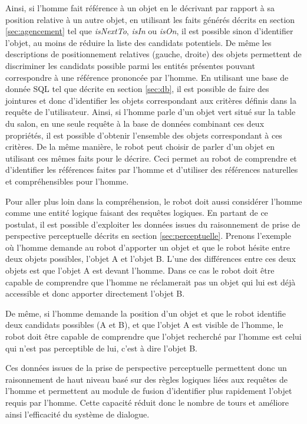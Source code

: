 \documentclass[a4paper,11pt,twoside]{StyleThese}
\begin{document}
Ainsi, si l'homme fait référence à un objet en le décrivant par rapport à sa position relative à un autre objet, en utilisant les faits générés décrits en section \ref{sec:agencement} tel que \textit{isNextTo}, \textit{isIn} ou \textit{isOn}, il est possible sinon d'identifier l'objet, au moins de réduire la liste des candidats potentiels. De même les descriptions de positionnement relatives (gauche, droite) des objets permettent de discriminer les candidats possible parmi les entités présentes pouvant correspondre à une référence prononcée par l'homme.
En utilisant une base de donnée SQL tel que décrite en section \ref{sec:db}, il est possible de faire des jointures et donc d'identifier les objets correspondant aux critères définis dans la requête de l'utilisateur.
Ainsi, si l'homme parle d'un objet vert situé sur la table du salon, en une seule requête à la base de données combinant ces deux propriétés, il est possible d'obtenir l'ensemble des objets correspondant à ces critères.
De la même manière, le robot peut choisir de parler d'un objet en utilisant ces mêmes faits pour le décrire.
Ceci permet au robot de comprendre et d'identifier les références faites par l'homme et d'utiliser des références naturelles et compréhensibles pour l'homme.

Pour aller plus loin dans la compréhension, le robot doit aussi considérer l'homme comme une entité logique faisant des requêtes logiques. En partant de ce postulat, il est possible d'exploiter les données issues du raisonnement de prise de perspective perceptuelle décrits en section \ref{sec:perceptuelle}.
Prenons l'exemple où l'homme demande au robot d'apporter un objet et que le robot hésite entre deux objets possibles, l'objet A et l'objet B. L'une des différences entre ces deux objets est que l'objet A est devant l'homme. Dans ce cas le robot doit être capable de comprendre que l'homme ne réclamerait pas un objet qui lui est déjà accessible et donc apporter directement l'objet B.

De même, si l'homme demande la position d'un objet et que le robot identifie deux candidats possibles (A et B), et que l'objet A est visible de l'homme, le robot doit être capable de comprendre que l'objet recherché par l'homme est celui qui n'est pas perceptible de lui, c'est à dire l'objet B.

Ces données issues de la prise de perspective perceptuelle permettent donc un raisonnement de haut niveau basé sur des règles logiques liées aux requêtes de l'homme et permettent au module de fusion d'identifier plus rapidement l'objet requis par l'homme. Cette capacité réduit donc le nombre de tours et améliore ainsi l'efficacité du système de dialogue.
\end{document}
